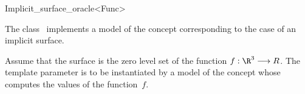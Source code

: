 

\begin{ccRefClass}{Implicit_surface_oracle<Func>}  %


\ccDefinition
  
The class \ccRefName\  implements a model of the concept
 corresponding to the case
of an implicit surface. 

Assume that the  surface is
the zero level set of the function
$f : \R^3 \longrightarrow R$. The template parameter
  is to be instantiated by a model of the concept
 whose  computes the values 
of the function~$f$.


\ccIsModel








\ccSeeAlso







\end{ccRefClass}



